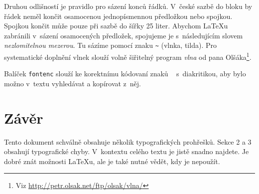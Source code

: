 \documentclass[a4paper, 10pt, twocolumn]{article}
\begin{document}
Druhou odlišností je pravidlo pro sázení konců řádků.
V~české sazbě do bloku by řádek neměl končit osamocenou jednopísmennou předložkou nebo spojkou.
Spojkou  končit může pouze při sazbě do šířky 25 liter.
Abychom \LaTeX u zabránili v~sázení osamocených předložek, spojujeme je s~následujícím slovem \emph{nezlomitelnou mezerou}.
Tu sázíme pomocí znaku \verb+~+ (vlnka, tilda).
Pro systematické doplnění vlnek slouží volně šiřitelný program \emph{vlna} od pana Olšáka\footnote{Viz \url{http://petr.olsak.net/ftp/olsak/vlna/}}.

Balíček \verb+fontenc+ slouží ke korektnímu kódovaní znaků ~ s~diakritikou, aby bylo možno v~textu vyhledávat a kopírovat z~něj.

\section{Závěr}
Tento dokument schválně obsahuje několik typografických prohřešků.
Sekce 2 a 3 obsahují typografické chyby.
V~kontextu celého textu je jistě snadno najdete.
Je dobré znát možnosti \LaTeX u, ale je také nutné vědět, kdy je nepoužít.
\end{document}

